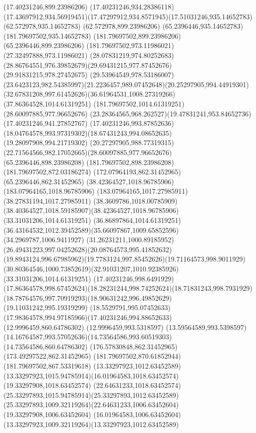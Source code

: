 {{	\closepath
	\moveto(17.40231246,899.23986206)
	\lineto(17.40231246,934.28386118)
	\curveto(17.43697912,934.56919451)(17.47297912,934.8571945)(17.51031246,935.14652783)
	\lineto(62.572978,935.14652783)
	\lineto(62.572978,899.23986206)
	\closepath
	\moveto(65.2396446,935.14652783)
	\lineto(181.79697502,935.14652783)
	\lineto(181.79697502,899.23986206)
	\lineto(65.2396446,899.23986206)
	\closepath
	\moveto(181.79697502,973.11986021)
	\lineto(27.32497888,973.11986021)
	\curveto(28.07831219,974.80252683)(28.86764551,976.39852679)(29.69431215,977.87452676)
	\lineto(29.91831215,978.27452675)
	\lineto(29.53964549,978.53186007)
	\curveto(23.6423123,982.54385997)(21.2236457,989.07452648)(20.25297905,994.44919301)
	\curveto(32.67831208,997.61452626)(36.61964531,1008.27319266)(37.86364528,1014.61319251)
	\lineto(181.79697502,1014.61319251)
	\closepath
	\moveto(28.60097885,977.96652676)
	\curveto(23.28364565,968.262527)(19.47831241,953.84652736)(17.40231246,941.27852767)
	\lineto(17.40231246,993.87852636)
	\curveto(18.04764578,993.97319302)(18.67431243,994.08652635)(19.28097908,994.21719302)
	\curveto(20.27297905,988.77319315)(22.71564566,982.17052665)(28.60097885,977.96652676)
	\moveto(65.2396446,898.23986208)
	\lineto(181.79697502,898.23986208)
	\lineto(181.79697502,872.03186274)
	\lineto(172.07964193,862.31452965)
	\lineto(65.2396446,862.31452965)
	\closepath
	\moveto(38.42364527,1018.96785906)
	\lineto(183.07964165,1018.96785906)
	\lineto(183.07964165,1017.27985911)
	\lineto(38.27831194,1017.27985911)
	\curveto(38.3609786,1018.00785909)(38.40364527,1018.59185907)(38.42364527,1018.96785906)
	\moveto(33.31031206,1014.61319251)
	\lineto(36.86897864,1014.61319251)
	\curveto(36.43164532,1012.39452589)(35.66097867,1009.65852596)(34.2969787,1006.9411927)
	\curveto(31.26231211,1000.89185952)(26.49431223,997.04252628)(20.08764573,995.41852632)
	\curveto(19.8943124,996.67985962)(19.7783124,997.85452626)(19.71164573,998.9011929)
	\curveto(30.80364546,1000.73852619)(32.91031207,1010.92385926)(33.31031206,1014.61319251)
	\moveto(17.40231246,998.6491929)
	\curveto(17.86364578,998.67452624)(18.28231244,998.74252624)(18.71831243,998.7931929)
	\curveto(18.78764576,997.70919293)(18.90631242,996.49852629)(19.11031242,995.19319299)
	\curveto(18.5529791,995.07452633)(17.98364578,994.97185966)(17.40231246,994.88652633)
	\closepath
	\moveto(12.9996459,860.64786302)
	\lineto(12.9996459,993.5318597)
	\curveto(13.59564589,993.5398597)(14.16764587,993.57052636)(14.73564586,993.60519303)
	\lineto(14.73564586,860.64786302)
	\closepath
	\moveto(176.57830848,862.31452965)
	\lineto(173.49297522,862.31452965)
	\lineto(181.79697502,870.61852944)
	\lineto(181.79697502,867.53319618)
	\closepath
	\moveto(13.33297923,1012.63452589)
	\curveto(13.33297923,1015.94785914)(16.01964583,1018.63452574)(19.33297908,1018.63452574)
	\curveto(22.64631233,1018.63452574)(25.33297893,1015.94785914)(25.33297893,1012.63452589)
	\curveto(25.33297893,1009.32119264)(22.64631233,1006.63452604)(19.33297908,1006.63452604)
	\curveto(16.01964583,1006.63452604)(13.33297923,1009.32119264)(13.33297923,1012.63452589)
}
}

